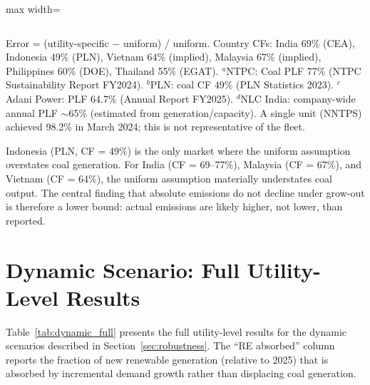\documentclass[review,3p,authoryear]{elsarticle}
\begin{document}
\begin{table}[H]
\begin{adjustbox}{max width=\linewidth}
\begin{tabular}{@{}llrcccr@{}}
\bottomrule
\end{tabular}
\end{adjustbox}
\begin{flushleft}
\footnotesize{Error = (utility-specific $-$ uniform) / uniform. Country CFs: India 69\% (CEA), Indonesia 49\% (PLN), Vietnam 64\% (implied), Malaysia 67\% (implied), Philippines 60\% (DOE), Thailand 55\% (EGAT). $^{a}$NTPC: Coal PLF 77\% (NTPC Sustainability Report FY2024). $^{b}$PLN: coal CF 49\% (PLN Statistics 2023). $^{c}$Adani Power: PLF 64.7\% (Annual Report FY2025). $^{d}$NLC India: company-wide annual PLF $\sim$65\% (estimated from generation/capacity). A single unit (NNTPS) achieved 98.2\% in March 2024; this is not representative of the fleet.}
\end{flushleft}
\end{table}

Indonesia (PLN, CF = 49\%) is the only market where the uniform assumption overstates coal generation. For India (CF = 69--77\%), Malaysia (CF = 67\%), and Vietnam (CF = 64\%), the uniform assumption materially understates coal output. The central finding that absolute emissions do not decline under grow-out is therefore a lower bound: actual emissions are likely higher, not lower, than reported.

\section{Dynamic Scenario: Full Utility-Level Results}
\label{app:dynamic}

Table~\ref{tab:dynamic_full} presents the full utility-level results for the dynamic scenarios described in Section~\ref{sec:robustness}. The ``RE absorbed'' column reports the fraction of new renewable generation (relative to 2025) that is absorbed by incremental demand growth rather than displacing coal generation.
\end{document}
